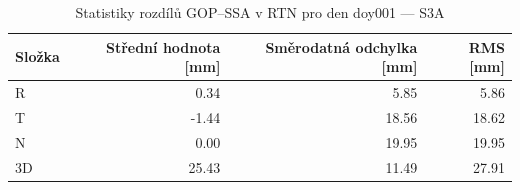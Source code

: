 \begin{table}[H]
\centering
\caption{Statistiky rozdílů GOP–SSA v RTN pro den doy001 — S3A}
\label{tab:as_ZAZG_doy001_day_stats}
\begin{tabular}{lrrr}
\toprule
Složka & Střední hodnota [mm] & Směrodatná odchylka [mm] & RMS [mm] \\
\midrule
R & 0.34 & 5.85 & 5.86 \\
T & -1.44 & 18.56 & 18.62 \\
N & 0.00 & 19.95 & 19.95 \\
3D & 25.43 & 11.49 & 27.91 \\
\bottomrule
\end{tabular}
\end{table}
